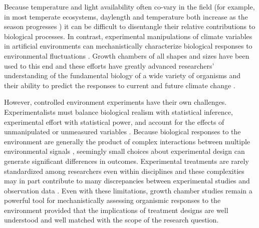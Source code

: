 \documentclass[11pt]{article}
\begin{document}
\noindent Because temperature and light availability often co-vary in the field (for example, in most temperate ecosystems, daylength and temperature both increase as the season progresses \citep{Rosenberg1974}) it can be difficult to disentangle their relative contributions to biological processes. In contrast, experimental manipulations of climate variables in artificial environments can mechanistically characterize biological responses to environmental fluctuations \citep{Ettinger:2020aa,Primack2015}. Growth chambers of all shapes and sizes have been used to this end \citep{Downs:1980us} and these efforts have greatly advanced researchers' understanding of the fundamental biology of a wide variety of organisms and their ability to predict the responses to current and future climate change \citep{Stewart:2013wz}.

However, controlled environment experiments have their own challenges. Experimentalists must balance biological realism with statistical inference, experimental effort with statistical power, and account for the effects of unmanipulated or unmeasured variables \citep{schneiner2001}. Because biological responses to the environment are generally the product of complex interactions between multiple environmental signals \citep{Casal:2002vz}, seemingly small choices about experimental design can generate significant differences in outcomes. Experimental treatments are rarely standardized among researchers even within disciplines \citep{limitingcues} and these complexities may in part contribute to many discrepancies between experimental studies and observation data \citep{Poorter:2016aa}. Even with these limitations, growth chamber studies remain a powerful tool for mechanistically assessing organismic responses to the environment provided that the implications of treatment designs are well understood and well matched with the scope of the research question. 
\end{document}
